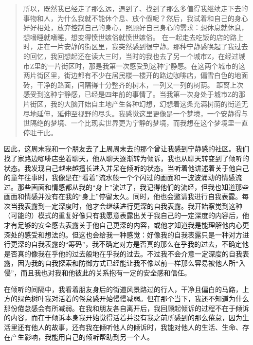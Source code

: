 \blockquote{
	所以，既然我已经走了那么远，遇到了、找到了那么多值得我继续走下去的事物和人，为什么我就不能休个息、放个假呢？然后，我试着和自己的身心好好相处，放弃控制自己的身心，照顾好自己身心的需求：想休息就休息，想嗜睡就嗜睡，想变得愤世嫉俗就愤世嫉俗。
	在一起走去吃饭的店的路上时，走在一片安静的街区里，我突然感到很宁静。那种宁静感唤起了我过去的回忆，我回想起还在读大三时，当时的我也去了另一个城市Z，在经过城市Z里的一片街区时，那是我第一次感受到这种宁静感。在这两个城市的这两片街区里，街边都有不少在居民楼一楼开的路边咖啡店，偏雪白色的地面砖，干净的路面，间隔得十分整齐的树木，一列又一列的树荫。
	距离上次感受到这种宁静感，已经是四年前的事情了。当我第一次身处于城市Z的那片街区，我的大脑开始自主地产生各种幻想，幻想着这条充满树荫的街道无尽地延伸，延伸至视野的尽头。我感觉这里更像是一个梦境，一个安静得与世隔绝的梦境、一个比现实世界更为宁静的梦境，而我想在这个梦境里一直停驻于此。

}

因此，这周末我和一个朋友去了上周周末去的那个曾让我感到宁静感的社区。我们找了家路边咖啡店坐着聊天，他从聊天逐渐转为倾诉，我也从聊天转变到了倾听的状态。我发现自己越来越擅长进入并呆在倾听的状态。当听着他讲述着关于他自己的童年往事时，我像是在“看着”流水般一个个闪过的画面和一波波涌动的情感流过。那些画面和情感都从我的“身上”流过了，我记得他们的流经，但我也知道那些画面和情感并没有在我的“身上”停留太久。同时，他也会邀请我进行自我表露。每次当我表露到一定深度时，他才会继续进行更深的自我表露。我开始察觉到这种（可能的）模式的重复\pozhehao{}好像只有我愿意表露出关于我自己的一定深度的内容后，他才有足够的安全感去表露关于他自己更深的内容，或他才知道我是能理解他内心更深处的感受和想法的。但这也会给我一种感觉：好像我的自我表露只是一种对方进行更深的自我表露的“筹码”，我不确定对方是否真的那么在乎我的过去，不确定他是否真的像我在乎他的过去般地在乎我的过去。不过我不会介意一定深度的自我表露，因为我的自我探索和防御方式已经能让我不像以前一样那么容易被他人所“入侵”，而且我也对我和他彼此的关系抱有一定的安全感和信任。

\tristarsepline

在倾听的间隔中，我看着朋友身后的街道风景\pozhehao{}路过的行人，干净且偏白的马路，上方的绿色树叶\pozhehao{}我对活着的倦怠感开始慢慢减弱。但在那个当下，我还不知道为什么那份倦怠感会有所减弱。在我和朋友各自离开后，我回顾起倾诉的过程\pozhehao{}不在于倾诉的内容，而在于倾诉本身\pozhehao{}我开始觉得活着并没有我之前所感到的那么倦怠，因为生活里还有他人的故事，还有我在倾听他人的倾诉时，我能对他人的生活、生命、存在产生影响，我能用自己的倾听帮助到另一个人。


